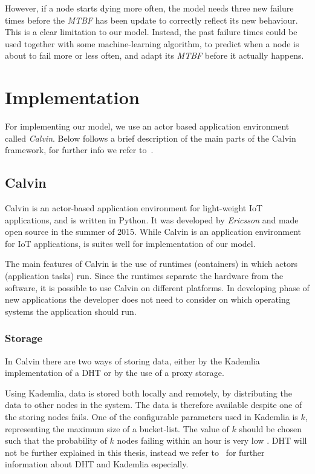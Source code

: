 \documentclass{cslthse-msc}
\begin{document}
However, if a node starts dying more often, the model needs three new failure times before the \emph{MTBF} has been update to correctly reflect its new behaviour. This is a clear limitation to our model. Instead, the past failure times could be used together with some machine-learning algorithm, to predict when a node is about to fail more or less often, and adapt its \emph{MTBF} before it actually happens.

\section{Implementation} \label{sec:design_implementation}
For implementing our model, we use an actor based application environment called \emph{Calvin}. Below follows a brief description of the main parts of the Calvin framework, for further info we refer to~\cite{calvin}.

\subsection{Calvin} \label{subsec:design_calvin}
Calvin is an actor-based application environment for light-weight IoT applications, and is written in Python. It was developed by \emph{Ericsson} and made open source in the summer of 2015. While Calvin is an application environment for IoT applications, is suites well for implementation of our model.

The main features of Calvin is the use of runtimes (containers) in which actors (application tasks) run. Since the runtimes separate the hardware from the software, it is possible to use Calvin on different platforms. In developing phase of new applications the developer does not need to consider on which operating systems the application should run.

\subsubsection{Storage} \label{sec:calvin_storage}
In Calvin there are two ways of storing data, either by the Kademlia implementation of a DHT or by the use of a proxy storage.

Using Kademlia, data is stored both locally and remotely, by distributing the data to other nodes in the system. The data is therefore available despite one of the storing nodes fails. One of the configurable parameters used in Kademlia is $k$, representing the maximum size of a bucket-list. The value of $k$ should be chosen such that the probability of $k$ nodes failing within an hour is very low \cite{kademlia}. DHT will not be further explained in this thesis, instead we refer to~\cite{kademlia} for further information about DHT and Kademlia especially. 
\end{document}
